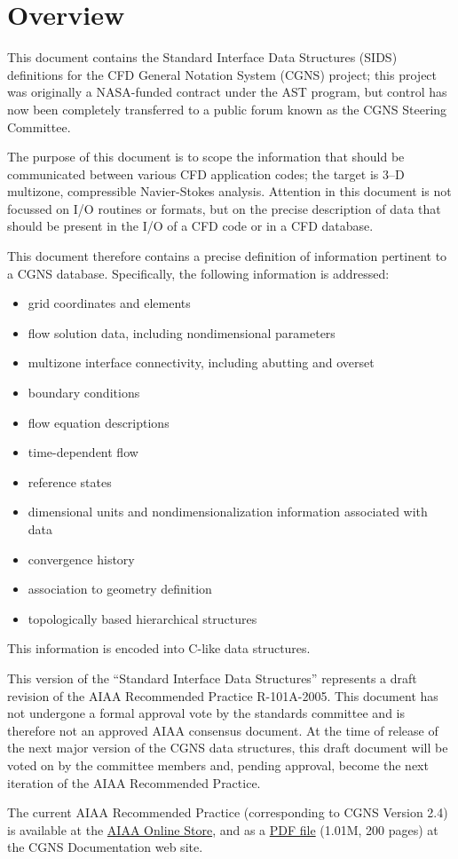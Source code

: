 \hypertarget{overview}{}
\section*{Overview}
\thispagestyle{plain}

This document contains the Standard Interface Data Structures (SIDS)
definitions for the CFD General Notation System (CGNS) project; this
project was originally a NASA-funded contract under the AST program, but
control has now been completely transferred to a public forum known as
the CGNS Steering Committee.

The purpose of this document is to scope the information that should be
communicated between various CFD application codes; the target is 3--D
multizone, compressible Navier-Stokes analysis.
Attention in this document is not focussed on I/O routines or formats,
but on the precise description of data that should be present in the I/O
of a CFD code or in a CFD database.

This document therefore contains a precise definition of information
pertinent to a CGNS database.
Specifically, the following information is addressed:
\begin{itemize}
\item grid coordinates and elements
\item flow solution data, including nondimensional parameters
\item multizone interface connectivity, including abutting and overset
\item boundary conditions
\item flow equation descriptions
\item time-dependent flow
\item reference states
\item dimensional units and nondimensionalization information associated
      with data
\item convergence history
\item association to geometry definition
\item topologically based hierarchical structures
\end{itemize}
This information is encoded into C-like data structures.

This version of the ``Standard Interface Data Structures'' represents a
draft revision of the AIAA Recommended Practice R-101A-2005.
This document has not undergone a formal approval vote by the standards
committee and is therefore not an approved AIAA consensus document.
At the time of release of the next major version of the CGNS data
structures, this draft document will be voted on by the committee
members and, pending approval, become the next iteration of the AIAA
Recommended Practice.

The current AIAA Recommended Practice (corresponding to CGNS Version
2.4) is available at the
\href{http://www.aiaa.org/content.cfm?pageid=363&id=1657}{AIAA
Online Store}, and as a
\href{http://www.grc.nasa.gov/www/cgns/sids/aiaa/R_101A_2005.pdf}{PDF file}
(1.01M, 200 pages) at the CGNS Documentation web site.
